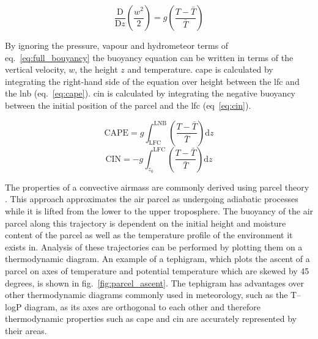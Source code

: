 \begin{eqfloat}
    \begin{equation}
    \label{eq:simple_bouyancy}
        \frac{\mathrm{D} }{\mathrm{D} z} \left (\frac{w^2}{2}  \right ) = g \left ( \frac{T - \bar{T}}{\bar{T}} \right )
    \end{equation}
    \caption{By ignoring the pressure, vapour and hydrometeor terms of eq.~\ref{eq:full_bouyancy} the buoyancy equation can be written in terms of the vertical velocity, $w$, the height $z$ and temperature. \acrshort{cape} is calculated by integrating the right-hand side of the equation over height between the \acrshort{lfc} and the \acrfull{lnb} (eq.~\ref{eq:cape}). \acrshort{cin} is calculated by integrating the negative buoyancy between the initial position of the parcel and the \acrshort{lfc} (eq~\ref{eq:cin}).}
    \begin{equation}
    \label{eq:cape}
        \mathrm{CAPE} = g \int_{\mathrm{LFC}}^{\mathrm{LNB}} \left ( \frac{T - \bar{T}}{\bar{T}} \right ) \mathrm{d}z
    \end{equation}
    \begin{equation}
    \label{eq:cin}
        \mathrm{CIN} = - g \int_{z_0}^{\mathrm{LFC}} \left ( \frac{T - \bar{T}}{\bar{T}} \right ) \mathrm{d}z
    \end{equation}
\end{eqfloat}

The properties of a convective airmass are commonly derived using parcel theory \citep[][e.g.]{emanuel1983lagrangian}. 
This approach approximates the air parcel as undergoing adiabatic processes while it is lifted from the lower to the upper troposphere. 
The buoyancy of the air parcel along this trajectory is dependent on the initial height and moisture content of the parcel as well as the temperature profile of the environment it exists in. 
Analysis of these trajectories can be performed by plotting them on a thermodynamic diagram. 
An example of a tephigram, which plots the ascent of a parcel on axes of temperature and potential temperature which are skewed by 45 degrees, is shown in fig.~\ref{fig:parcel_ascent}.
The tephigram has advantages over other thermodynamic diagrams commonly used in meteorology, such as the T--logP diagram, as its axes are orthogonal to each other and therefore thermodynamic properties such as \acrshort{cape} and \acrshort{cin} are accurately represented by their areas.


